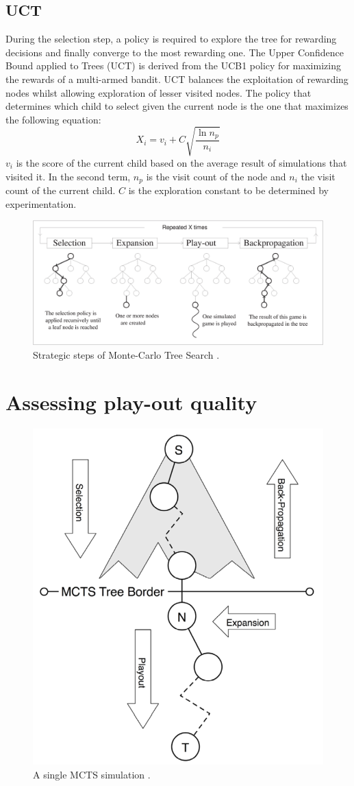 \documentclass{ecai2010}
\begin{document}
\subsection{UCT}
\label{subsec:uct}
During the selection step, a policy is required to explore the tree for rewarding decisions and finally converge to the most rewarding one. The Upper Confidence Bound applied to Trees (UCT) \cite{kocsis2006bandit} is derived from the UCB1 policy \cite{auer2002using} for maximizing the rewards of a multi-armed bandit. UCT balances the exploitation of rewarding nodes whilst allowing exploration of lesser visited nodes. The policy that determines which child to select given the current node is the one that maximizes the following equation:
\begin{equation}
\label{eq:uct}
X_i = v_i + C \sqrt{ \frac{\ln{n_p}}{n_i}}
\end{equation}
$v_i$ is the score of the current child based on the average result of simulations that visited it. In the second term, $n_p$ is the visit count of the node and $n_i$ the visit count of the current child. $C$ is the exploration constant to be determined by experimentation.
\begin{figure}[t]
	\centering
	\includegraphics[width=.45\textwidth]{img/figure1.eps}
	\caption{Strategic steps of Monte-Carlo Tree Search \cite{chaslot2008progressive}.}
	\label{fig:mcts-algorithm}
\end{figure}

\section{Assessing play-out quality}
\label{sec:poqual}

\begin{figure}[ht]
	\centering
	\includegraphics[width=.3\textwidth]{img/figure2.png}
	\caption{A single MCTS simulation \cite{finnsson2010learning}.}
	\label{fig:mcts-simulation}
\end{figure}
\end{document}
